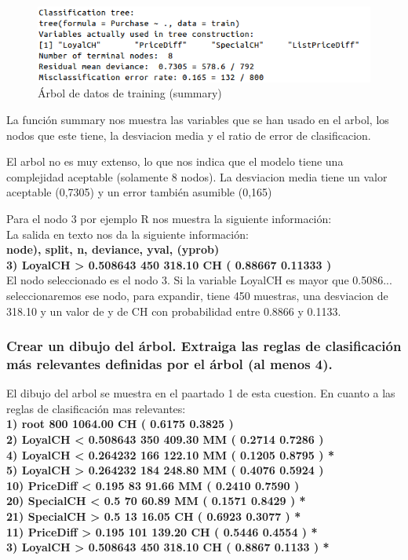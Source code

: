 \begin{figure}[H]
\centering
\includegraphics[scale=0.50]{ej2-2.png}
\caption{Árbol de datos de training (summary)}
\label{}
\end{figure}

La función summary nos muestra las variables que se han usado en el arbol, los nodos que este tiene, la desviacion media y el ratio de error de clasificacion.

El arbol no es muy extenso, lo que nos indica que el modelo tiene una complejidad aceptable (solamente 8 nodos). La desviacion media tiene un valor aceptable (0,7305) y un error también asumible (0,165)

Para el nodo 3 por ejemplo R nos muestra la siguiente información:\\

La salida en texto nos da la siguiente información:\\

\textbf{node), split, n, deviance, yval, (yprob)}\\


\textbf{3) LoyalCH > 0.508643 450  318.10 CH ( 0.88667 0.11333 )} \\


El nodo seleccionado es el nodo 3. Si la variable LoyalCH es mayor que 0.5086... seleccionaremos ese nodo,  para expandir, tiene 450 muestras, una desviacion de 318.10 y un valor de y de CH con probabilidad entre 0.8866 y 0.1133.

\subsubsection{Crear un dibujo del árbol. Extraiga las reglas de clasificación más relevantes definidas por el árbol (al menos 4).}

El dibujo del arbol se muestra en el paartado 1 de esta cuestion. En cuanto a las reglas de clasificación mas relevantes:\\

\textbf{1) root 800 1064.00 CH ( 0.6175 0.3825 )  \\
   2) LoyalCH < 0.508643 350  409.30 MM ( 0.2714 0.7286 )  \\
     4) LoyalCH < 0.264232 166  122.10 MM ( 0.1205 0.8795 ) *\\
     5) LoyalCH > 0.264232 184  248.80 MM ( 0.4076 0.5924 )  \\
      10) PriceDiff < 0.195 83   91.66 MM ( 0.2410 0.7590 ) \\ 
        20) SpecialCH < 0.5 70   60.89 MM ( 0.1571 0.8429 ) *\\
        21) SpecialCH > 0.5 13   16.05 CH ( 0.6923 0.3077 ) *\\
      11) PriceDiff > 0.195 101  139.20 CH ( 0.5446 0.4554 ) *\\
   3) LoyalCH > 0.508643 450  318.10 CH ( 0.8867 0.1133 ) *\\}
   
